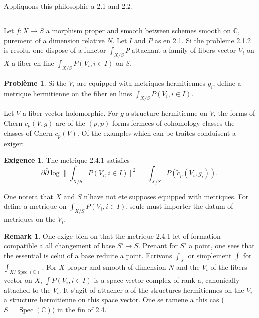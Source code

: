\documentclass[12pt,a4paper]{article}
\theoremstyle{plain}
\theoremstyle{definition}
\newtheorem{remark}[theorem]{Remark}
\newtheorem{probleme}[theorem]{Probl\`eme}
\newtheorem{exigence}[theorem]{Exigence}
\DeclareMathOperator{\Spec}{Spec}
\newcommand{\CC}{\mathbb{C}}
\begin{document}
Appliquons this philosophie a 2.1 and 2.2.

\subsection{}

Let $f: X \to S$ a morphism proper and smooth between schemes smooth on $\CC$,
purement of a dimension relative $N$. Let $I$ and $P$ as en 2.1. Si the
probleme 2.1.2 is resolu, one dispose of a functor $\int_{X/S} P$ attachant a family
of fibers vector $V_i$ on $X$ a fiber en line $\int_{X/S} P(V_i, i \in I)$ on
$S$.

\begin{probleme}
Si the $V_i$ are equipped with metriques hermitiennes $g_i$, define
a metrique hermitienne on the fiber en lines $\int_{X/S} P(V_i, i \in I)$.
\end{probleme}

Let $V$ a fiber vector holomorphic. For $g$ a structure hermitienne
on $V$, the forms of Chern $\tilde{c}_p(V,g)$ are of the $(p,p)$-forms fermees of cohomology classes the classes of Chern $c_p(V)$. Of the examples which can be traites
conduisent a exiger:

\begin{exigence}
The metrique 2.4.1 satisfies
\[
\partial \bar\partial \log \|\textstyle \int_{X/S} P(V_i, i \in I)\|^2 = \int_{X/S} P(\tilde{c}_p(V_i, g_i)) .
\]
\end{exigence}

One notera that $X$ and $S$ n'have not ete supposes equipped with metriques. For
define a metrique on $\int_{X/S} P(V_i, i \in I)$, seule must importer the datum
of metriques on the $V_i$.

\begin{remark}
One exige bien on that the metrique 2.4.1 let of formation compatible
a all changement of base $S' \to S$. Prenant for $S'$ a point, one sees that the
essential is celui of a base reduite a point. Ecrivons $\int_X$ or simplement
$\int$ for $\int_{X/\Spec(\CC)}$. For $X$ proper and smooth of dimension $N$ and the $V_i$ of the
fibers vector on $X$, $\int P(V_i, i \in I)$ is a space vector complex of
rank a, canonically attached to the $V_i$. It s'agit of attacher a of the structures
hermitiennes on the $V_i$ a structure hermitienne on this space vector.
One se ramene a this cas ($S = \Spec(\CC)$) in the fin of 2.4.
\end{remark}
\end{document}
